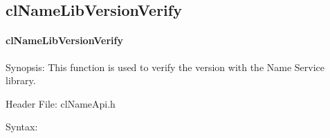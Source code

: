 \begin{flushleft}
\subsection{clNameLibVersionVerify}
\hypertarget{pagens111}{}\paragraph{cl\-Name\-Lib\-Version\-Verify}\label{pagens111}
\begin{Desc}
\item[Synopsis:]This function is used to verify the version with the Name Service library.\end{Desc}
\begin{Desc}
\item[Header File:]clNameApi.h\end{Desc}
\begin{Desc}
\item[Syntax:]


\end{Desc}
\end{flushleft}

